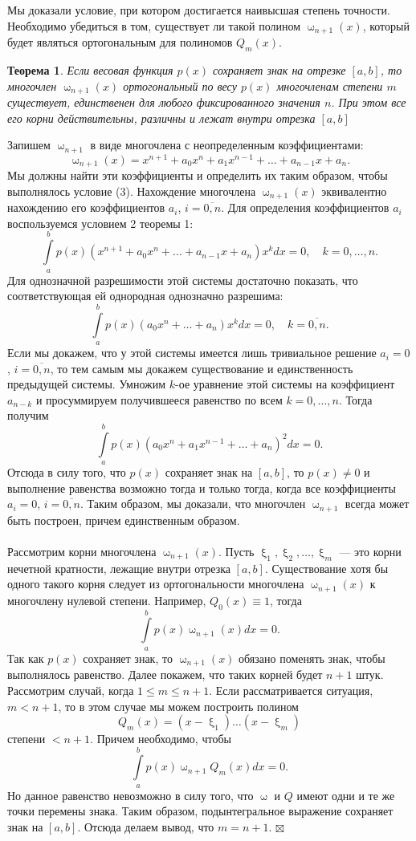 \documentclass[a4paper, 12pt]{report}
\newenvironment{Proof} %
{\par\noindent{$\blacklozenge$}} %
{\hfill$\scriptstyle\boxtimes$}
\renewcommand{\leq}{\leqslant}
\renewcommand{\omega}{\upomega}
\renewcommand{\xi}{\upxi}
\newtheorem*{theorem}{Теорема}
\begin{document}
	 	\\\\
	 	Мы доказали условие, при котором достигается наивысшая степень точности. Необходимо убедиться в том, существует ли такой полином $\omega_{n+1}(x)$, который будет являться ортогональным для полиномов $Q_m(x)$.
	 	\begin{theorem}
	 		Если весовая функция $p(x)$ сохраняет знак на отрезке $[a,b]$, то многочлен $\omega_{n+1}(x)$ ортогональный по весу $p(x)$ многочленам степени $m$ существует, единственен для любого фиксированного значения $n$. При этом все его корни действительны, различны и лежат внутри отрезка $[a,b]$	 	\end{theorem}
	\begin{Proof}
		Запишем $\omega_{n+1}$ в виде многочлена с неопределенным коэффициентами: $$\omega_{n+1}(x) = x^{n+1} + a_0x^n + a_1x^{n-1} + \ldots + a_{n-1}x+a_n.$$
		Мы должны найти эти коэффициенты и определить их таким образом, чтобы выполнялось условие (3). Нахождение многочлена $\omega_{n+1}(x)$ эквивалентно нахождению его коэффициентов $a_i$, $i=\overline{0,n}$. Для определения коэффициентов $a_i$ воспользуемся условием 2 теоремы 1:
		$$\int\limits_a^b p(x)(x^{n+1} + a_0x^n + \ldots + a_{n-1}x+a_n) x^k dx= 0,\quad k=0,\ldots,n.$$
		Для однозначной разрешимости этой системы достаточно показать, что соответствующая ей однородная однозначно разрешима:
		$$\int\limits_a^b p(x)(a_0x^n + \ldots +a_n) x^k dx= 0,\quad k=\overline{0,n}.$$
		Если мы докажем, что у этой системы имеется лишь тривиальное решение $a_i = 0$, $i=\overline{0,n}$, то тем самым мы докажем существование и единственность предыдущей системы. Умножим $k$-ое уравнение этой системы на коэффициент $a_{n-k}$ и просуммируем получившееся равенство по всем $k=0,\ldots,n$. Тогда получим $$\int\limits_a^b p(x) (a_0x^n + a_1x^{n-1} + \ldots + a_n)^2dx = 0.$$
		Отсюда в силу того, что $p(x)$ сохраняет знак на $[a,b]$, то $p(x)\ne 0$ и выполнение равенства возможно тогда и только тогда, когда все коэффициенты $a_i =0$, $i=\overline{0,n}$. Таким образом, мы доказали, что многочлен $\omega_{n+1}$ всегда может быть построен, причем единственным образом.\\\\
		Рассмотрим корни многочлена $\omega_{n+1}(x)$. Пусть $\xi_1,\xi_2,\ldots,\xi_m$ --- это корни нечетной кратности, лежащие внутри отрезка $[a,b]$. Существование хотя бы одного такого корня следует из ортогональности многочлена $\omega_{n+1}(x)$ к многочлену нулевой степени. Например, $Q_0(x) \equiv 1$, тогда $$\int\limits_a^b p(x)\omega_{n+1}(x)dx = 0.$$
		Так как $p(x)$  сохраняет знак, то $\omega_{n+1}(x)$ обязано поменять знак, чтобы выполнялось равенство. Далее покажем, что таких корней будет $n+1$ штук. Рассмотрим случай, когда $1 \leq m \leq n+1$. Если рассматривается ситуация, $m < n+1$, то в этом случае мы можем построить полином $$Q_m(x)=(x-\xi_1)\ldots (x-\xi_m)$$ степени $<n+1$. Причем необходимо, чтобы $$\int\limits_a^b p(x)\omega_{n+1}Q_m(x)dx = 0.$$ Но данное равенство невозможно в силу того, что $\omega$ и $Q$ имеют одни и те же точки перемены знака. Таким образом, подынтегральное выражение сохраняет знак на $[a,b]$. Отсюда делаем вывод, что $m = n+1$.
	\end{Proof}\\\\
\end{document}
